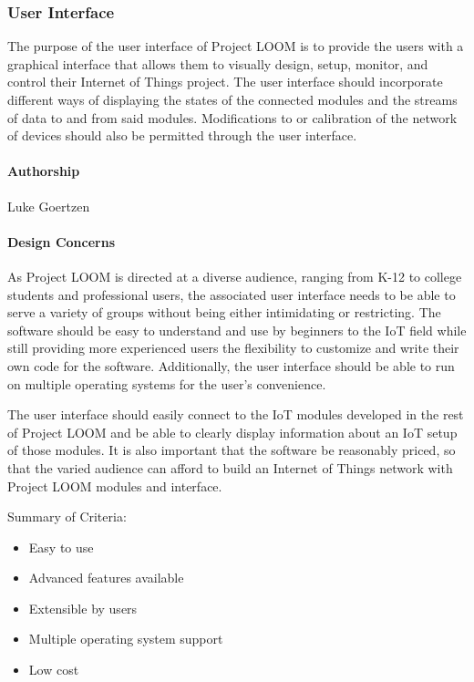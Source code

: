 \documentclass[onecolumn, draftclsnofoot,10pt, compsoc]{IEEEtran}
\begin{document}
\subsubsection{User Interface}
    The purpose of the user interface of Project LOOM is to provide the users with a graphical interface that allows them to visually design, setup, monitor, and control their Internet of Things project. The user interface should incorporate different ways of displaying the states of the connected modules and the streams of data to and from said modules. Modifications to or calibration of the network of devices should also be permitted through the user interface.

\paragraph{Authorship}
    Luke Goertzen

\paragraph{Design Concerns}
    As Project LOOM is directed at a diverse audience, ranging from K-12 to college students and professional users, the associated user interface needs to be able to serve a variety of groups without being either intimidating or restricting. The software should be easy to understand and use by beginners to the IoT field while still providing more experienced users the flexibility to customize and write their own code for the software. Additionally, the user interface should be able to run on multiple operating systems for the user's convenience.

    The user interface should easily connect to the IoT modules developed in the rest of Project LOOM and be able to clearly display information about an IoT setup of those modules. It is also important that the software be reasonably priced, so that the varied audience can afford to build an Internet of Things network with Project LOOM modules and interface.

    Summary of Criteria:
    \begin{itemize}[noitemsep,topsep=-10pt]
        \item Easy to use
        \item Advanced features available
        \item Extensible by users
        \item Multiple operating system support
        \item Low cost
    \end{itemize}
\end{document}
